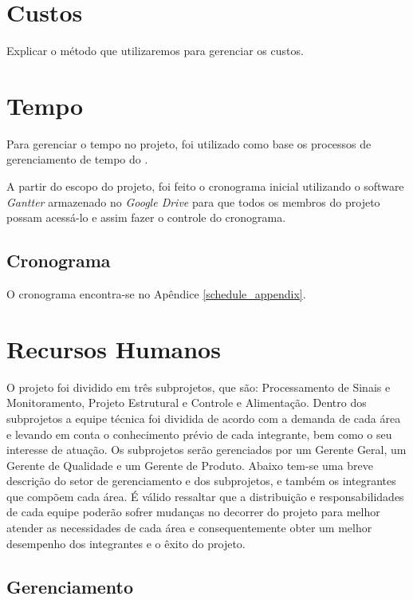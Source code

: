 \section{Custos}

Explicar o método que utilizaremos para gerenciar os custos.

\section{Tempo}

Para gerenciar o tempo no projeto, foi utilizado como base os processos
de gerenciamento de tempo do \cite{pmbok2012}.

A partir do escopo do projeto, foi feito o cronograma inicial utilizando o software \textit{Gantter} armazenado no \textit{Google Drive} para que todos os membros do projeto
possam acessá-lo e assim fazer o controle do cronograma.

\subsection{Cronograma}

O cronograma encontra-se no Apêndice \ref{schedule_appendix}.

\section{Recursos Humanos}

O projeto foi dividido em três subprojetos, que são: Processamento de Sinais e Monitoramento,
Projeto Estrutural e Controle e Alimentação. Dentro dos subprojetos a equipe
técnica foi dividida de acordo com a demanda de cada área e levando em conta o
conhecimento prévio de cada integrante, bem como o seu interesse de atuação. Os
subprojetos serão gerenciados por um Gerente Geral, um Gerente de Qualidade e
um Gerente de Produto.
Abaixo tem-se uma breve descrição do setor de gerenciamento e dos subprojetos,
e também os integrantes que compõem cada área. É válido ressaltar que a
distribuição e responsabilidades de cada equipe poderão sofrer mudanças no
decorrer do projeto para melhor atender as necessidades de cada área e
consequentemente obter um melhor desempenho dos integrantes e o êxito do projeto.

\subsection{Gerenciamento}

